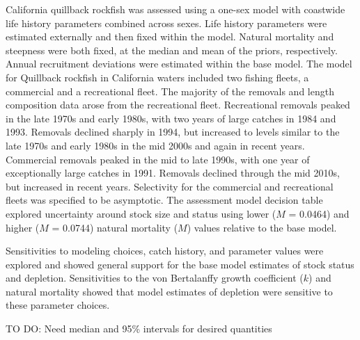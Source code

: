 \documentclass[11pt,
  english,
  a4paper,
]{article}
\begin{document}
California quillback rockfish was assessed using a one-sex model with coastwide life history parameters combined across sexes. Life history parameters were estimated externally and then fixed within the model. Natural mortality and steepness were both fixed, at the median and mean of the priors, respectively. Annual recruitment deviations were estimated within the base model. The model for Quillback rockfish in California waters included two fishing fleets, a commercial and a recreational fleet. The majority of the removals and length composition data arose from the recreational fleet. Recreational removals peaked in the late 1970s and early 1980s, with two years of large catches in 1984 and 1993. Removals declined sharply in 1994, but increased to levels similar to the late 1970s and early 1980s in the mid 2000s and again in recent years. Commercial removals peaked in the mid to late 1990s, with one year of exceptionally large catches in 1991. Removals declined through the mid 2010s, but increased in recent years. Selectivity for the commercial and recreational fleets was specified to be asymptotic. The assessment model decision table explored uncertainty around stock size and status using lower ({\(M\)\leavevmode\tagmcend\tagstructend} = 0.0464) and higher ({\(M\)\leavevmode\tagmcend\tagstructend} = 0.0744) natural mortality ({\(M\)\leavevmode\tagmcend\tagstructend}) values relative to the base model.

\leavevmode\tagmcend\tagstructend\par


Sensitivities to modeling choices, catch history, and parameter values were explored and showed general support for the base model estimates of stock status and depletion. Sensitivities to the von Bertalanffy growth coefficient ({\(k\)\leavevmode\tagmcend\tagstructend}) and natural mortality showed that model estimates of depletion were sensitive to these parameter choices.

\leavevmode\tagmcend\tagstructend\par


TO DO: Need median and 95\% intervals for desired quantities

\leavevmode\tagmcend\tagstructend\par
\end{document}
